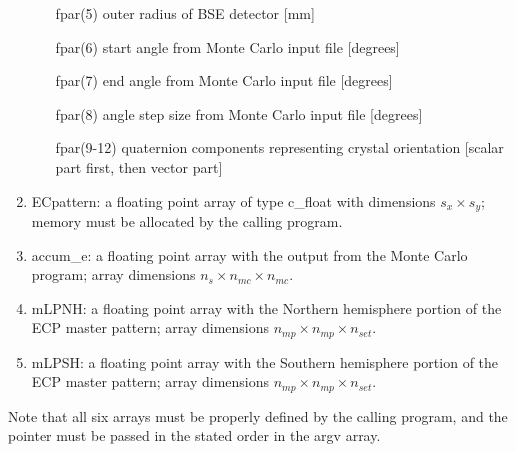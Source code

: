 \documentclass[DIV=calc, paper=letter, fontsize=11pt]{scrartcl}	 %
\begin{document}
\begin{enumerate}
\begin{enumerate}
		\item[\textsf{fpar}(5)] outer radius of BSE detector [mm]
		\item[\textsf{fpar}(6)] start angle from Monte Carlo input file [degrees]
		\item[\textsf{fpar}(7)] end angle from Monte Carlo input file [degrees]
		\item[\textsf{fpar}(8)] angle step size from Monte Carlo input file [degrees]
		\item[\textsf{fpar}(9-12)] quaternion components representing crystal orientation [scalar part first, then vector part]
	\end{enumerate}
	\item \textsf{ECpattern}: a floating point array of type \textsf{c\_float} with dimensions $s_x\times s_y$; memory must be allocated by the calling program.
	\item \textsf{accum\_e}: a floating point array with the output from the Monte Carlo program; array dimensions $n_{s}\times n_{mc}\times n_{mc}$.
	\item \textsf{mLPNH}: a floating point array with the Northern hemisphere portion of the ECP master pattern; array dimensions $n_{mp}\times n_{mp}\times n_{set}$.
	\item \textsf{mLPSH}: a floating point array with the Southern hemisphere portion of the ECP master pattern; array dimensions $n_{mp}\times n_{mp}\times n_{set}$.
\end{enumerate}
Note that all six arrays must be properly defined by the calling program, and the pointer must be passed in the stated order in the \textsf{argv} array.



\newpage
\end{document}
